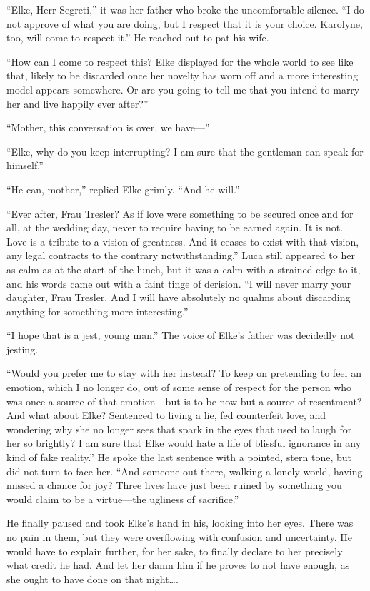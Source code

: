 ``Elke, Herr Segreti,'' it was her father who broke the uncomfortable silence. ``I do not approve of what you are doing, but I respect that it is your choice. Karolyne, too, will come to respect it.'' He reached out to pat his wife.

``How can I come to respect this? Elke displayed for the whole world to see like that, likely to be discarded once her novelty has worn off and a more interesting model appears somewhere. Or are you going to tell me that you intend to marry her and live happily ever after?''

``Mother, this conversation is over, we have---''

``Elke, why do you keep interrupting? I am sure that the gentleman can speak for himself.''

``He can, mother,'' replied Elke grimly. ``And he will.''

``Ever after, Frau Tresler? As if love were something to be secured once and for all, at the wedding day, never to require having to be earned again. It is not. Love is a tribute to a vision of greatness. And it ceases to exist with that vision, any legal contracts to the contrary notwithstanding.'' Luca still appeared to her as calm as at the start of the lunch, but it was a calm with a strained edge to it, and his words came out with a faint tinge of derision. ``I will never marry your daughter, Frau Tresler. And I will have absolutely no qualms about discarding anything for something more interesting.''

``I hope that is a jest, young man.'' The voice of Elke's father was decidedly not jesting.

``Would you prefer me to stay with her instead? To keep on pretending to feel an emotion, which I no longer do, out of some sense of respect for the person who was once a source of that emotion---but is to be now but a source of resentment? And what about Elke? Sentenced to living a lie, fed counterfeit love, and wondering why she no longer sees that spark in the eyes that used to laugh for her so brightly? I am sure that Elke would hate a life of blissful ignorance in any kind of fake reality.'' He spoke the last sentence with a pointed, stern tone, but did not turn to face her. ``And someone out there, walking a lonely world, having missed a chance for joy? Three lives have just been ruined by something you would claim to be a virtue---the ugliness of sacrifice.''

He finally paused and took Elke's hand in his, looking into her eyes. There was no pain in them, but they were overflowing with confusion and uncertainty. He would have to explain further, for her sake, to finally declare to her precisely what credit he had. And let her damn him if he proves to not have enough, as she ought to have done on that night\ldots.

